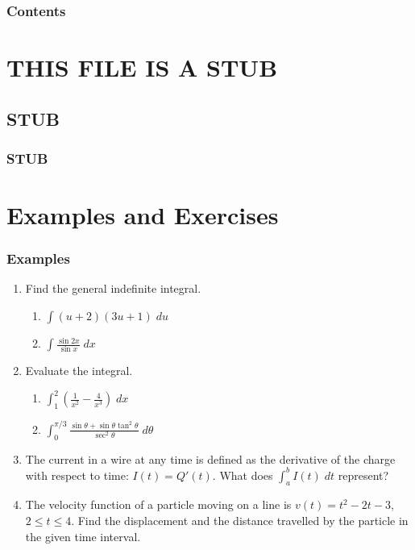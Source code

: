 \documentclass[serif,ignorenonframetext]{beamer}
\title{\commonTitleZeroFourFour}
\subtitle{\commonSubtitleZeroFourFour}
\author{\commonAuthor}
\institute{\commonInstitute}
\date{\commonDateZeroFourFour}
\begin{document}

\begin{frame}
  \titlepage
\end{frame}


\begin{frame}
  \frametitle{Contents}
  \tableofcontents
\end{frame}

\section{THIS FILE IS A STUB}


\subsection{STUB}

\begin{frame}
  \frametitle{STUB}
\end{frame}


\section{Examples and Exercises}

\begin{frame}
  \frametitle{Examples}
  \begin{enumerate}
  \item Find the general indefinite integral.
    \begin{enumerate}
    \item $\int (u+2)(3u+1) \; du$
    \item $\int \frac{\sin 2x}{\sin x} \; dx$
    \end{enumerate}
  \item Evaluate the integral.
    \begin{enumerate}
    \item $\int_1^2 \left(\frac{1}{x^2} - \frac{4}{x^3}\right) \; dx$
    \item $\int_0^{\pi/3} \frac{\sin\theta + \sin\theta\tan^2\theta}{\sec^2\theta} \; d\theta$
    \end{enumerate}
  \item The current in a wire at any time is defined as the derivative
    of the charge with respect to time: $I(t)=Q'(t)$.  What does
    $\int_a^b I(t) \; dt$ represent?
  \item The velocity function of a particle moving on a line is
    $v(t)=t^2-2t-3$, $2\le t\le 4$.  Find the displacement and the
    distance travelled by the particle in the given time interval.
  \end{enumerate}
\end{frame}
\end{document}
